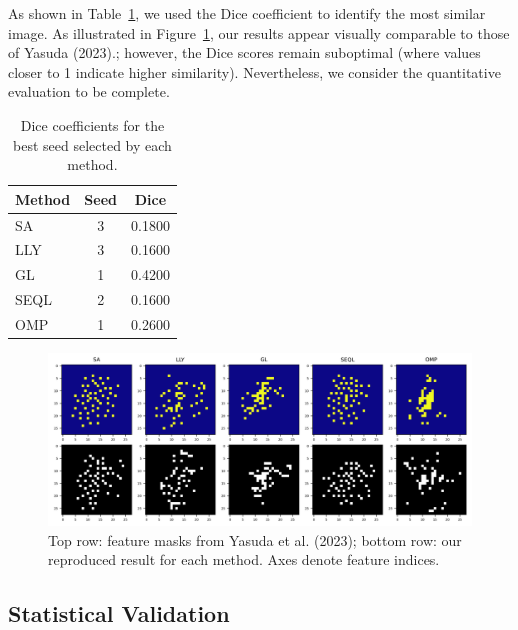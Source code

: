 \documentclass[a4paper,twocolumn]{article} %
\begin{document}
As shown in Table~\ref{tab:dice_results}, we used the Dice coefficient to identify the most similar image. As illustrated in Figure~\ref{fig:feature_masks}, our results appear visually comparable to those of Yasuda (2023).; however, the Dice scores remain suboptimal (where values closer to 1 indicate higher similarity). Nevertheless, we consider the quantitative evaluation to be complete.
\begin{table}[ht]
    \centering
    \begin{tabular}{lcc}
        \hline
        \textbf{Method} & \textbf{Seed} & \textbf{Dice} \\
        \hline
        SA    & 3 & 0.1800 \\
        LLY   & 3 & 0.1600 \\
        GL    & 1 & 0.4200 \\
        SEQL  & 2 & 0.1600 \\
        OMP   & 1 & 0.2600 \\
        \hline
    \end{tabular}
    \caption{Dice coefficients for the best seed selected by each method.}
    \label{tab:dice_results}
\end{table}
\begin{figure}[h!]
    \centering
    \includegraphics[width=\textwidth]{figures/all_methods_with_axis.png}
    \caption{Top row: feature masks from Yasuda et al. (2023); bottom row: our reproduced result for each method. Axes denote feature indices.}
    \label{fig:feature_masks}
\end{figure}

\subsection{Statistical Validation}
\end{document}
